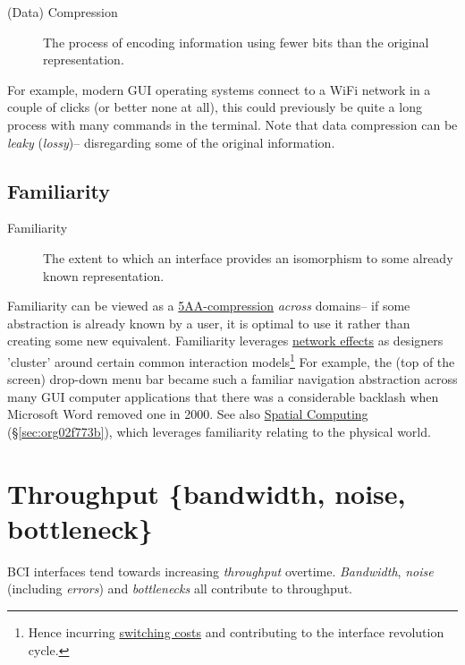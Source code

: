 \documentclass[logo,bsc,singlespacing,parskip]{infthesis}
\begin{document}
\begin{mdframed}
\begin{description}
\item[{(Data) Compression\label{compression}}] The process of encoding information using fewer bits than the original representation.
\end{description}
\end{mdframed}

For example, modern GUI operating systems connect to a WiFi network in a couple of clicks (or better none at all), this could previously be quite a long process with many commands in the terminal.
Note that data compression can be \emph{leaky} (\emph{lossy})-- disregarding some of the original information.

\subsection{Familiarity}
\label{sec:orgd8aae3f}
\medskip
\begin{mdframed}
\begin{description}
\item[{Familiarity\label{familiarity}}] The extent to which an interface provides an isomorphism to some already known representation.
\end{description}
\end{mdframed}

Familiarity can be viewed as a \hyperref[compression]{5AA-compression} \emph{across} domains-- if some abstraction is already known by a user, it is optimal to use it rather than creating some new equivalent.
Familiarity leverages \hyperref[network effects]{network effects} as designers 'cluster' around certain common interaction models\footnote{Hence incurring \hyperref[switching costs]{switching costs} and contributing to the interface revolution cycle.}
For example, the (top of the screen) drop-down menu bar became such a familiar navigation abstraction across many GUI computer applications that there was a considerable backlash when Microsoft Word removed one in 2000.
See also \hyperref[sec:org02f773b]{Spatial Computing} (\S \ref{sec:org02f773b}), which leverages familiarity relating to the physical world.

\section{Throughput \{bandwidth, noise, bottleneck\}}
\label{sec:orgd4a5814}
BCI interfaces tend towards increasing \emph{throughput} overtime. \emph{Bandwidth}, \emph{noise} (including \emph{errors}) and \emph{bottlenecks} all contribute to throughput.
\end{document}
